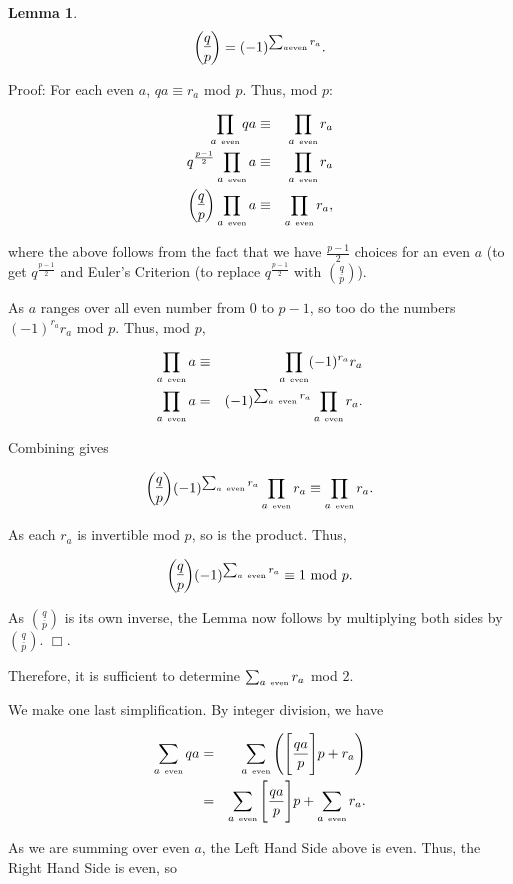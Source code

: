 \documentclass[12pt,letterpaper]{report}
\newcommand\be{\begin{equation}}
\newcommand\ee{\end{equation}}
\newcommand\bea{\begin{eqnarray}}
\newcommand\eea{\end{eqnarray}}
\newcommand{\js}[1]{ { \underline{#1} \choose p} }
\newtheorem{lem}[thm]{Lemma}
\begin{document}
\begin{lem} \be \js{q} = (-1)^{\sum_{a \mbox{\tiny even}} r_a }. \ee
\end{lem}

Proof: For each even $a$, $qa \equiv r_a$ mod $p$. Thus, mod $p$:

\bea \prod_{a \ \mbox{\tiny even}} qa & \equiv & \prod_{a \
\mbox{\tiny even}} r_a \nonumber\\ q^{\frac{p-1}{2}} \prod_{a \
\mbox{\tiny even}} a & \equiv & \prod_{a \ \mbox{\tiny even}} r_a
\nonumber\\ \js{q} \prod_{a \ \mbox{\tiny even}} a & \equiv &
\prod_{a \ \mbox{\tiny even}} r_a, \eea

where the above follows from the fact that we have $\frac{p-1}{2}$
choices for an even $a$ (to get $q^{\frac{p-1}{2}}$ and Euler's
Criterion (to replace $q^{\frac{p-1}{2}}$ with $\js{q}$).

As $a$ ranges over all even number from $0$ to $p-1$, so too do
the numbers $(-1)^{r_a} r_a$ mod $p$. Thus, mod $p$,

\bea \prod_{a \ \mbox{\tiny even}} a & \equiv & \prod_{a \
\mbox{\tiny even}} (-1)^{r_a} r_a \nonumber\\ \prod_{a \
\mbox{\tiny even}} a & = & (-1)^{\sum_{a \ \mbox{\tiny even}} r_a}
\prod_{a \ \mbox{\tiny even}} r_a. \eea

Combining gives

\be \js{q} (-1)^{\sum_{a \ \mbox{\tiny even}} r_a} \prod_{a \
\mbox{\tiny even}} r_a \equiv \prod_{a \ \mbox{\tiny even}} r_a.
\ee

As each $r_a$ is invertible mod $p$, so is the product. Thus,

\be \js{q} (-1)^{\sum_{a \ \mbox{\tiny even}} r_a} \equiv 1 \
\mbox{mod} \ p. \ee

As $\js{q}$ is its own inverse, the Lemma now follows by
multiplying both sides by $\js{q}$. $\Box$.


Therefore, it is sufficient to determine $\sum_{a \ \mbox{\tiny
even}} r_a$ mod $2$.

We make one last simplification. By integer division, we have

\bea \sum_{a \ \mbox{\tiny even}} qa &=& \sum_{a \ \mbox{\tiny
even}} \Bigg( \Bigg[ \frac{qa}{p} \Bigg] p + r_a \Bigg)
\nonumber\\ &=& \sum_{a \ \mbox{\tiny even}} \Bigg[ \frac{qa}{p}
\Bigg] p + \sum_{a \ \mbox{\tiny even}} r_a. \eea

As we are summing over even $a$, the Left Hand Side above is even.
Thus, the Right Hand Side is even, so
\end{document}
